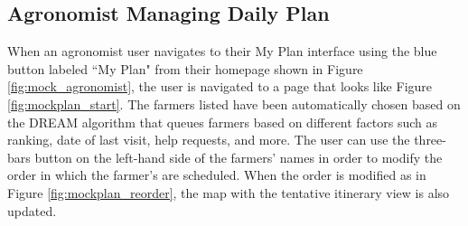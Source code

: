 \newpage
\subsection{Agronomist Managing Daily Plan}
\begin{flushleft}
When an agronomist user navigates to their My Plan interface using the blue button labeled “My Plan" from their homepage shown in Figure \ref{fig:mock_agronomist}, the user is navigated to a page that looks like Figure \ref{fig:mockplan_start}. The farmers listed have been automatically chosen based on the DREAM algorithm that queues farmers based on different factors such as ranking, date of last visit, help requests, and more. The user can use the three-bars button on the left-hand side of the farmers' names in order to modify the order in which the farmer's are scheduled. When the order is modified as in Figure \ref{fig:mockplan_reorder}, the map with the tentative itinerary view is also updated. 
\end{flushleft}

